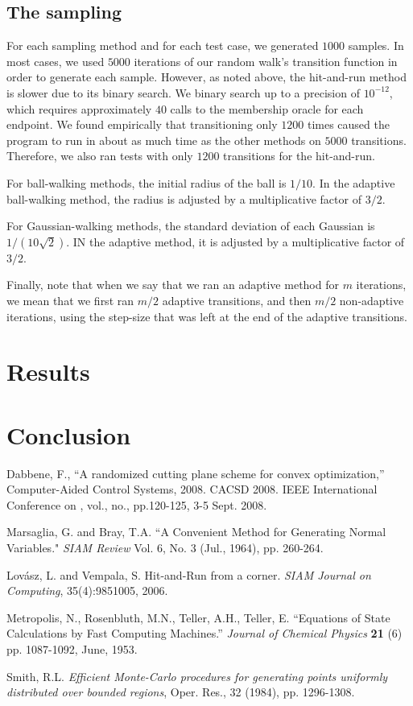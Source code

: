 \documentclass[11pt]{article}
\begin{document}
\subsection{The sampling}

For each sampling method and for each test case, we generated $1000$ samples. In most cases, we used $5000$ iterations of our random walk's transition function in order to generate each sample. However, as noted above, the hit-and-run method is slower due to its binary search. We binary search up to a precision of $10^{-12}$, which requires approximately $40$ calls to the membership oracle for each endpoint. We found empirically that transitioning only $1200$ times caused the program to run in about as much time as the other methods on $5000$ transitions. Therefore, we also ran tests with only $1200$ transitions for the hit-and-run.

For ball-walking methods, the initial radius of the ball is $1/10$. In the adaptive ball-walking method, the radius is adjusted by a multiplicative factor of $3/2$.

For Gaussian-walking methods, the standard deviation of each Gaussian is $1/(10\sqrt{2})$. IN the adaptive method, it is adjusted by a multiplicative factor of $3/2$.

Finally, note that when we say that we ran an adaptive method for $m$ iterations, we mean that we first ran $m/2$ adaptive transitions, and then $m/2$ non-adaptive iterations, using the step-size that was left at the end of the adaptive transitions.

\section{Results}

\section{Conclusion}

\pagebreak

\begin{thebibliography}{99}

 Dabbene, F., ``A randomized cutting plane scheme for convex optimization,'' Computer-Aided Control Systems, 2008. CACSD 2008. IEEE International Conference on , vol., no., pp.120-125, 3-5 Sept. 2008.

 Marsaglia, G. and Bray, T.A. ``A Convenient Method for Generating Normal Variables." \emph{SIAM Review} Vol. 6, No. 3 (Jul., 1964), pp. 260-264.

 Lov\'asz, L. and Vempala, S. Hit-and-Run from a corner. \emph{SIAM Journal on Computing}, 35(4):9851005, 2006.

 Metropolis, N., Rosenbluth, M.N., Teller, A.H., Teller, E. ``Equations of State Calculations by Fast Computing Machines.'' \emph{Journal of Chemical Physics} \textbf{21} (6) pp. 1087-1092, June, 1953.

 Smith, R.L. \emph{Efficient Monte-Carlo procedures for generating points uniformly distributed over
bounded regions}, Oper. Res., 32 (1984), pp. 1296-1308.

\end{thebibliography}
\end{document}
